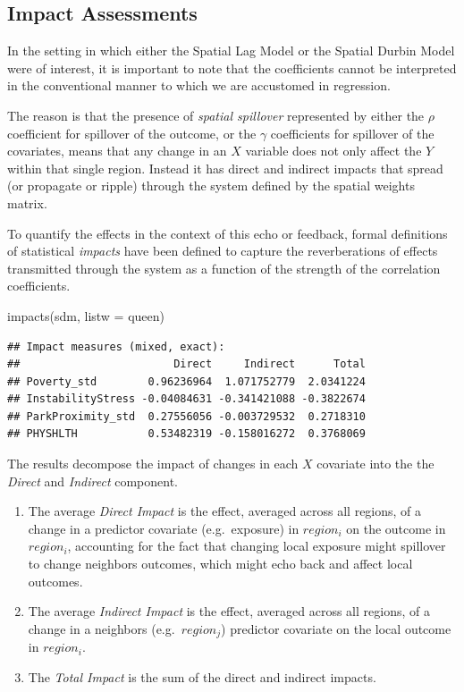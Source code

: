 \documentclass[
]{book}
\newenvironment{Shaded}{\begin{snugshade}}{\end{snugshade}}
\newcommand{\AttributeTok}[1]{\textcolor[rgb]{0.77,0.63,0.00}{#1}}
\newcommand{\FunctionTok}[1]{\textcolor[rgb]{0.00,0.00,0.00}{#1}}
\newcommand{\NormalTok}[1]{#1}
\providecommand{\tightlist}{%
  \setlength{\itemsep}{0pt}\setlength{\parskip}{0pt}}
\begin{document}
\hypertarget{impact-assessments}{%
\subsection{Impact Assessments}\label{impact-assessments}}

In the setting in which either the Spatial Lag Model or the Spatial Durbin Model were of interest, it is important to note that the coefficients cannot be interpreted in the conventional manner to which we are accustomed in regression.

The reason is that the presence of \emph{spatial spillover} represented by either the \(\rho\) coefficient for spillover of the outcome, or the \(\gamma\) coefficients for spillover of the covariates, means that any change in an \(X\) variable does not only affect the \(Y\) within that single region. Instead it has direct and indirect impacts that spread (or propagate or ripple) through the system defined by the spatial weights matrix.

To quantify the effects in the context of this echo or feedback, formal definitions of statistical \emph{impacts} have been defined to capture the reverberations of effects transmitted through the system as a function of the strength of the correlation coefficients.

\begin{Shaded}
\begin{Highlighting}[]
\FunctionTok{impacts}\NormalTok{(sdm, }\AttributeTok{listw =}\NormalTok{ queen)}
\end{Highlighting}
\end{Shaded}

\begin{verbatim}
## Impact measures (mixed, exact):
##                        Direct     Indirect      Total
## Poverty_std        0.96236964  1.071752779  2.0341224
## InstabilityStress -0.04084631 -0.341421088 -0.3822674
## ParkProximity_std  0.27556056 -0.003729532  0.2718310
## PHYSHLTH           0.53482319 -0.158016272  0.3768069
\end{verbatim}

The results decompose the impact of changes in each \(X\) covariate into the the \emph{Direct} and \emph{Indirect} component.

\begin{enumerate}
\def\labelenumi{\arabic{enumi}.}
\tightlist
\item
  The average \emph{Direct Impact} is the effect, averaged across all regions, of a change in a predictor covariate (e.g.~exposure) in \(region_i\) on the outcome in \(region_i\), accounting for the fact that changing local exposure might spillover to change neighbors outcomes, which might echo back and affect local outcomes.
\item
  The average \emph{Indirect Impact} is the effect, averaged across all regions, of a change in a neighbors (e.g.~\(region_j\)) predictor covariate on the local outcome in \(region_i\).
\item
  The \emph{Total Impact} is the sum of the direct and indirect impacts.
\end{enumerate}
\end{document}
